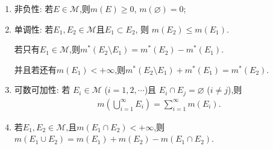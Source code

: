 \documentclass[../../main.tex]{subfiles}%
\begin{document}
\begin{theorem}[测度的基本性质]\label{theorem:测度的基本性质}
\begin{enumerate}[(1)]
\item 非负性: 若$E\in \mathscr{M}$,则\(m(E) \geqslant  0\), \(m(\varnothing)=0\);

\item\label{theorem:测度的基本性质-2} 单调性: 若$E_1,E_2\in \mathscr{M}$且\(E_1 \subset E_2\), 则 \(m(E_2) \leqslant  m(E_1)\).

若只有$E_1\in \mathscr{M}$,则$m^*(E_2\setminus E_1)=m^*(E_2)-m^*(E_1)$.

并且若还有$m(E_1)<+\infty$,则$m^*(E_2\setminus E_1)+m^*(E_1)=m^*(E_2)$.

\item 可数可加性: 若 \(E_i \in \mathscr{M}\) (\(i = 1,2,\cdots\))且 \(E_i \cap E_j = \varnothing\) (\(i \neq j\)),则
\begin{align*}
m\left(\bigcup_{i = 1}^{\infty} E_i\right) = \sum_{i = 1}^{\infty} m(E_i).
\end{align*}

\item\label{theorem:测度的基本性质-4} 若$E_1,E_2\in \mathscr{M}$,且$m(E_1\cap E_2)<+\infty$,则$m(E_1\cup E_2)=m(E_1)+m(E_2)-m(E_1\cap E_2)$.
\end{enumerate}
\end{theorem}
\end{document}
